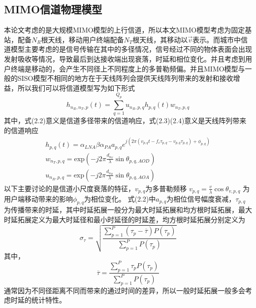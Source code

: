 \documentclass[bachelor,nocolorlinks, printoneside]{seuthesis} %
\begin{document}
\begin{Main}
\section{MIMO信道物理模型}
本论文考虑的是大规模MIMO模型的上行信道，所以本文MIMO模型考虑为固定基站，配备$N_{R}$根天线，移动用户终端配备$N_{T}$根天线，其移动以$\overrightarrow{v}$表示。而城市中信道模型主要考虑的是信号传输在其中的多径情况，信号经过不同的物体表面会出现发射吸收等情况，导致最后到达接收端出现衰落，时延和相位变化。并且考虑到用户终端是移动的，会产生不同径上不同程度上的多普勒频偏。并且MIMO模型与一般的SISO模型不相同的地方在于天线阵列会提供天线阵列带来的发射和接收增益，所以我们可以将信道模型写为如下形式
\begin{equation}\label{key}
h_{n_{R},n_{T},p}(t) = \sum_{q=1}^{Q_{p}}u_{n_{R},p,q}h_{p,q}(t)w_{n_{T},p,q}
\end{equation}
其中，式(2.2)意义是信道多径带来的信道响应，式(2.3)(2.4)意义是天线阵列带来的信道响应
\begin{eqnarray}\label{key}
h_{p,q}(t) = \alpha_{LNA}\beta\alpha_{PA}a_{p,q}e^{j(2\pi 
	(v_{p,q}t-f_{c}\tau_{p,q}-v_{p,q}\tau_{p,q})+\phi_{p,q}
	)} \\
w_{n_{T},p,q} = \mathrm{exp}(-j2\pi \frac{d_{n_{T}}}{\lambda}\sin \theta_{p,q,AOD})\\
u_{n_{R},p,q} = \mathrm{exp}(-j2\pi \frac{d_{n_{R}}}{\lambda}\sin \theta_{p,q,AOA})
\end{eqnarray}
以下主要讨论的是信道小尺度衰落的特征，$ v_{p,q} $为多普勒频移 $ v_{p,q} = \frac{v}{\lambda}\cos\theta_{v,p,q} $ 为用户端移动带来的影响$ \phi_{p,q} $为相位变化。
式(2.2)中$a_{p,q}$为相位信号幅度衰减，$\tau_{p,q}$为传播带来的时延，其中时延拓展一般分为最大时延拓展和均方根时延拓展，最大时延拓展定义为最大时延径和最小时延径的时延差，均方根时延拓展分别定义为
\begin{equation}\label{key}
\sigma_{\tau} = \sqrt{ 
	\frac{
		\sum_{p=1}^{P}(\tau_{p}-\overline{\tau})P(\tau_{p})
	}
	{
		\sum_{p=1}^{P}
		P(\tau_{p})
	}
}
\end{equation}
其中，
\begin{equation}\label{key}
\overline{\tau}=\frac
{\sum^{P}_{p=1}\tau_{p}P(\tau_{p})}
{\sum_{p=1}^{P}P(\tau_{p})}
\end{equation}
通常因为不同径距离不同而带来的通过时间的差异，所以一般时延拓展一般多会考虑时延的统计特性。


\end{Main}
\end{document}
